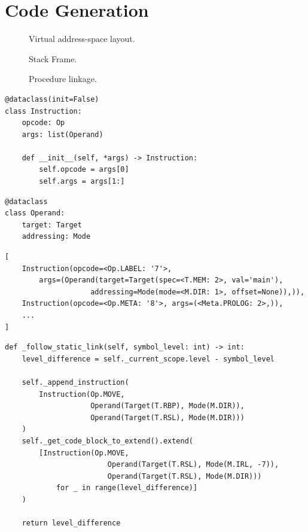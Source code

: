 \newpage

\section{Code Generation} \label{sec:code-gen}

\begin{figure}[H]
    \centering
    
    \caption{Virtual address-space layout.} 
    \label{fig:address_space}
\end{figure}

\begin{figure}[H]
    \centering
    
    \caption{Stack Frame.} 
    \label{fig:stack}
\end{figure}

\begin{figure}[H]
    \centering
    
    \caption{Procedure linkage.} 
    \label{fig:procedure}
\end{figure}

\begin{verbatim}
@dataclass(init=False)
class Instruction:
    opcode: Op
    args: list(Operand)

    def __init__(self, *args) -> Instruction:
        self.opcode = args[0]
        self.args = args[1:]
\end{verbatim}

\begin{verbatim}
@dataclass
class Operand:
    target: Target
    addressing: Mode
\end{verbatim}

\begin{verbatim}
[
    Instruction(opcode=<Op.LABEL: '7'>,
        args=(Operand(target=Target(spec=<T.MEM: 2>, val='main'),
                    addressing=Mode(mode=<M.DIR: 1>, offset=None)),)),
    Instruction(opcode=<Op.META: '8'>, args=(<Meta.PROLOG: 2>,)),
    ...
]
\end{verbatim}

\begin{verbatim}
def _follow_static_link(self, symbol_level: int) -> int:
    level_difference = self._current_scope.level - symbol_level

    self._append_instruction(
        Instruction(Op.MOVE,
                    Operand(Target(T.RBP), Mode(M.DIR)),
                    Operand(Target(T.RSL), Mode(M.DIR)))
    )
    self._get_code_block_to_extend().extend(
        [Instruction(Op.MOVE,
                        Operand(Target(T.RSL), Mode(M.IRL, -7)),
                        Operand(Target(T.RSL), Mode(M.DIR)))
            for _ in range(level_difference)]
    )

    return level_difference
\end{verbatim}


